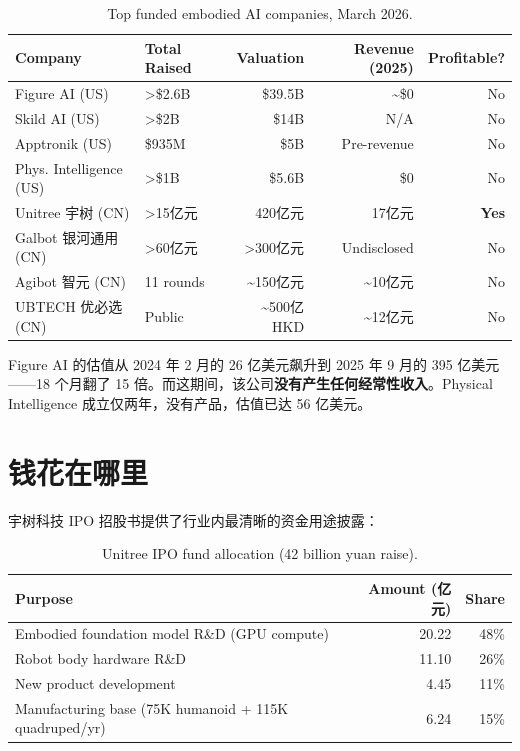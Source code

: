 \begin{table}[htbp]
\centering
\caption{Top funded embodied AI companies, March 2026.}
\label{tab:topfunded}
\begin{tabularx}{\textwidth}{lXrrr}
\toprule
\rowcolor{figLightGray}
\textbf{Company} & \textbf{Total Raised} & \textbf{Valuation} & \textbf{Revenue (2025)} & \textbf{Profitable?} \\
\midrule
Figure AI (US) & >\$2.6B & \$39.5B & \textasciitilde\$0 & No \\
Skild AI (US) & >\$2B & \$14B & N/A & No \\
Apptronik (US) & \$935M & \$5B & Pre-revenue & No \\
Phys. Intelligence (US) & >\$1B & \$5.6B & \$0 & No \\
\midrule
Unitree 宇树 (CN) & >15亿元 & 420亿元 & 17亿元 & \textbf{Yes} \\
Galbot 银河通用 (CN) & >60亿元 & >300亿元 & Undisclosed & No \\
Agibot 智元 (CN) & 11 rounds & \textasciitilde150亿元 & \textasciitilde10亿元 & No \\
UBTECH 优必选 (CN) & Public & \textasciitilde500亿HKD & \textasciitilde12亿元 & No \\
\bottomrule
\end{tabularx}
\end{table}

Figure AI 的估值从 2024 年 2 月的 26 亿美元飙升到 2025 年 9 月的 395 亿美元——18 个月翻了 15 倍\cite{figure2025seriesc}。而这期间，该公司\textbf{没有产生任何经常性收入}。Physical Intelligence 成立仅两年，没有产品，估值已达 56 亿美元\cite{pi2025seriesb}。

\section{钱花在哪里}

宇树科技 IPO 招股书提供了行业内最清晰的资金用途披露\cite{unitree2026ipo}：

\begin{table}[htbp]
\centering
\caption{Unitree IPO fund allocation (42 billion yuan raise).}
\label{tab:unitree-allocation}
\begin{tabular}{lrr}
\toprule
\rowcolor{figLightGray}
\textbf{Purpose} & \textbf{Amount (亿元)} & \textbf{Share} \\
\midrule
Embodied foundation model R\&D (GPU compute) & 20.22 & 48\% \\
Robot body hardware R\&D & 11.10 & 26\% \\
New product development & 4.45 & 11\% \\
Manufacturing base (75K humanoid + 115K quadruped/yr) & 6.24 & 15\% \\
\bottomrule
\end{tabular}
\end{table}

